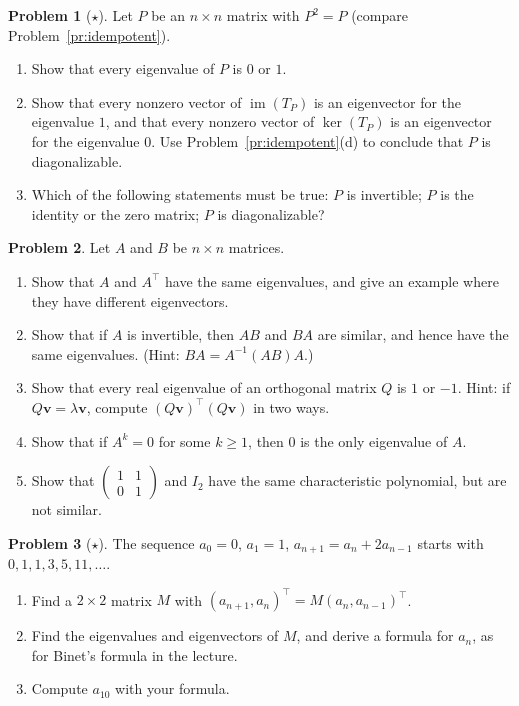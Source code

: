 \documentclass[11pt]{article}
\theoremstyle{definition}
\newtheorem{problem}{Problem}[section]
\DeclareMathOperator{\im}{im}
\begin{document}
\begin{problem}[$\star$]\label{pr:eig-idempotent}
    Let $P$ be an $n \times n$ matrix with $P^2 = P$ (compare Problem~\ref{pr:idempotent}).
    \begin{enumerate}[label=(\alph*)]
        \item Show that every eigenvalue of $P$ is $0$ or $1$.
        \item Show that every nonzero vector of $\im(T_P)$ is an eigenvector for the eigenvalue $1$, and that every nonzero vector of $\ker(T_P)$ is an eigenvector for the eigenvalue $0$. Use Problem~\ref{pr:idempotent}(d) to conclude that $P$ is diagonalizable.
        \item Which of the following statements must be true: $P$ is invertible; $P$ is the identity or the zero matrix; $P$ is diagonalizable?
    \end{enumerate}
\end{problem}

\begin{problem}\label{pr:eig-props}
    Let $A$ and $B$ be $n \times n$ matrices.
    \begin{enumerate}[label=(\alph*)]
        \item Show that $A$ and $A^\top$ have the same eigenvalues, and give an example where they have different eigenvectors.
        \item Show that if $A$ is invertible, then $AB$ and $BA$ are similar, and hence have the same eigenvalues. (Hint: $BA = A^{-1}(AB)A$.)
        \item Show that every real eigenvalue of an orthogonal matrix $Q$ is $1$ or $-1$. Hint: if $Q\mathbf{v} = \lambda \mathbf{v}$, compute $(Q\mathbf{v})^\top (Q\mathbf{v})$ in two ways.
        \item Show that if $A^k = 0$ for some $k \geq 1$, then $0$ is the only eigenvalue of $A$.
        \item Show that $\begin{pmatrix} 1 & 1 \\ 0 & 1 \end{pmatrix}$ and $I_2$ have the same characteristic polynomial, but are not similar.
    \end{enumerate}
\end{problem}

\begin{problem}[$\star$]\label{pr:eig-recurrence}
    The sequence $a_0 = 0$, $a_1 = 1$, $a_{n+1} = a_n + 2a_{n-1}$ starts with $0, 1, 1, 3, 5, 11, \ldots$.
    \begin{enumerate}[label=(\alph*)]
        \item Find a $2 \times 2$ matrix $M$ with $(a_{n+1}, a_n)^\top = M (a_n, a_{n-1})^\top$.
        \item Find the eigenvalues and eigenvectors of $M$, and derive a formula for $a_n$, as for Binet's formula in the lecture.
        \item Compute $a_{10}$ with your formula.
    \end{enumerate}
\end{problem}
\end{document}

